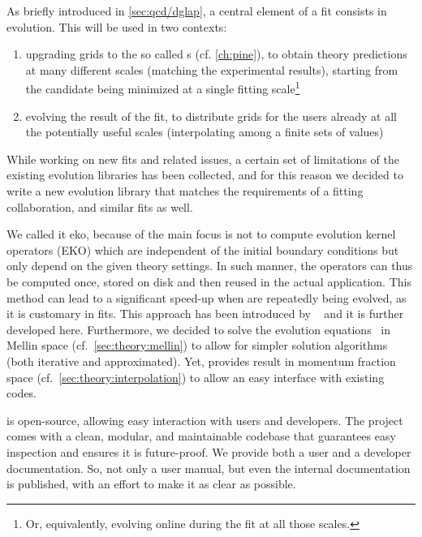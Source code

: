 
As briefly introduced in \cref{sec:qcd/dglap}, a central element of a \pdf fit
consists in \dglap evolution.
%
This will be used in two contexts: 
\begin{enumerate}[label=\roman*.]
  \item upgrading grids to the so called \fktab{}s (cf. \cref{ch:pine}), to
    obtain theory predictions at many different scales (matching the
    experimental results), starting from the \pdf candidate being minimized at
    a single fitting scale\footnote{
      Or, equivalently, evolving online during the fit at all those scales.
    }
  \item evolving the result of the fit, to distribute \pdf grids for the users
    already at all the potentially useful scales (interpolating among a finite
    sets of values)
\end{enumerate}

While working on new \pdf fits and related issues, a certain set of limitations
of the existing \dglap evolution libraries has been collected, and for this
reason we decided to write a new \qcd{} evolution library that matches the
requirements of a \pdf fitting collaboration, and similar fits as well.

We called it \acrfull{eko}, because of the main focus is not to compute
evolution kernel operators (EKO) which are independent of the initial boundary
conditions but only depend on the given theory settings.
In such manner, the operators can thus be computed once, stored on disk and
then reused in the actual application. This method can lead to a significant
speed-up when \pdfs are repeatedly being evolved, as it is customary in \pdf{}
fits.
This approach has been introduced by
\fk{}~\cite{Ball:2008by,Ball:2010de,DelDebbio:2007ee} and it is further
developed here.
%
Furthermore, we decided to solve the evolution equations~ in Mellin space (cf.\
\cref{sec:theory:mellin}) to allow for simpler solution algorithms (both
iterative and approximated).
Yet, \eko provides result in momentum fraction space (cf.\
\cref{sec:theory:interpolation}) to allow an easy interface with existing
codes.

\eko{} is open-source, allowing easy interaction with users
and developers.
The project comes with a clean, modular, and maintainable codebase that guarantees
easy inspection and ensures it is future-proof.
We provide both a user and a developer documentation. So, not only a user
manual, but even the internal documentation is published, with an effort to make
it as clear as possible.

